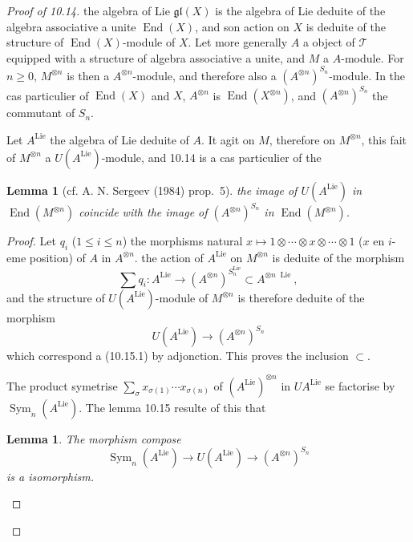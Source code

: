 \documentclass[11pt,a4paper]{article}
\theoremstyle{plain}
\newtheorem{lemma}[theorem]{Lemma}
\theoremstyle{definition}
\DeclareMathOperator{\End}{End}
\DeclareMathOperator{\Sym}{Sym}
\DeclareMathOperator{\Lie}{Lie}
\begin{document}
\begin{proof}[Proof of 10.14]
the algebra of Lie $\mathfrak{gl}(X)$ is the algebra of Lie deduite of the algebra associative a unite $\End(X)$, and son action on $X$ is deduite of the structure of $\End(X)$-module of $X$. Let more generally $A$ a object of $\mathcal{T}$ equipped with a structure of algebra associative a unite, and $M$ a $A$-module. For $n \geq 0$, $M^{\otimes n}$ is then a $A^{\otimes n}$-module, and therefore also a $(A^{\otimes n})^{S_n}$-module. In the cas particulier of $\End(X)$ and $X$, $A^{\otimes n}$ is $\End(X^{\otimes n})$, and $(A^{\otimes n})^{S_n}$ the commutant of $S_n$.

Let $A^{\Lie}$ the algebra of Lie deduite of $A$. It agit on $M$, therefore on $M^{\otimes n}$, this fait of $M^{\otimes n}$ a $U(A^{\Lie})$-module, and 10.14 is a cas particulier of the

\begin{lemma}[cf. A. N. Sergeev (1984) prop.~5]
the image of $U(A^{\Lie})$ in $\End(M^{\otimes n})$ coincide with the image of $(A^{\otimes n})^{S_n}$ in $\End(M^{\otimes n})$.
\end{lemma}

\begin{proof}
Let $q_i$ ($1 \leq i \leq n$) the morphisms natural $x \mapsto 1 \otimes \cdots \otimes x \otimes \cdots \otimes 1$ ($x$ en $i$-eme position) of $A$ in $A^{\otimes n}$. the action of $A^{\Lie}$ on $M^{\otimes n}$ is deduite of the morphism
\begin{equation}
\sum q_i : A^{\Lie} \to (A^{\otimes n})^{S_n^{\Lie}} \subset A^{\otimes n\;\Lie}, \tag{10.15.1}
\end{equation}
and the structure of $U(A^{\Lie})$-module of $M^{\otimes n}$ is therefore deduite of the morphism
\begin{equation}
U(A^{\Lie}) \to (A^{\otimes n})^{S_n} \tag{10.15.2}
\end{equation}
which correspond a (10.15.1) by adjonction. This proves the inclusion $\subset$.

The product symetrise $\sum_\sigma x_{\sigma(1)} \cdots x_{\sigma(n)}$ of $(A^{\Lie})^{\otimes n}$ in $U A^{\Lie}$ se factorise by $\Sym_n(A^{\Lie})$. The lemma 10.15 resulte of this that

\begin{lemma}
The morphism compose
\begin{equation}
\Sym_n(A^{\Lie}) \to U(A^{\Lie}) \to (A^{\otimes n})^{S_n} \tag{10.16.1}
\end{equation}
is a isomorphism.
\end{lemma}


\end{proof}
\end{proof}
\end{document}
